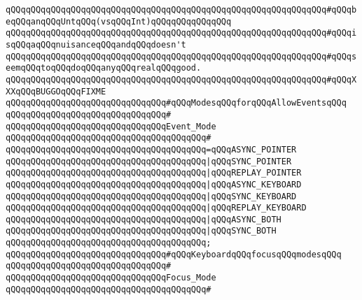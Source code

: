 \verb|qQQqqQQqqQQqqQQqqQQqqQQqqQQqqQQqqQQqqQQqqQQqqQQqqQQqqQQqqQQqqQQq#qQQqbeqQQqanqQQqUntqQQq(vsqQQqInt)qQQqqQQqqQQqqQQq|\newline
\verb|qQQqqQQqqQQqqQQqqQQqqQQqqQQqqQQqqQQqqQQqqQQqqQQqqQQqqQQqqQQqqQQq#qQQqisqQQqaqQQqnuisanceqQQqandqQQqdoesn't|\newline
\verb|qQQqqQQqqQQqqQQqqQQqqQQqqQQqqQQqqQQqqQQqqQQqqQQqqQQqqQQqqQQqqQQq#qQQqseemqQQqtoqQQqdoqQQqanyqQQqrealqQQqgood.|\newline
\verb|qQQqqQQqqQQqqQQqqQQqqQQqqQQqqQQqqQQqqQQqqQQqqQQqqQQqqQQqqQQqqQQq#qQQqXXXqQQqBUGGOqQQqFIXME|\newline
\newline
\verb|qQQqqQQqqQQqqQQqqQQqqQQqqQQqqQQq#qQQqModesqQQqforqQQqAllowEventsqQQq|\newline
\verb|qQQqqQQqqQQqqQQqqQQqqQQqqQQqqQQq#|\newline
\verb|qQQqqQQqqQQqqQQqqQQqqQQqqQQqqQQqEvent_Mode|\newline
\verb|qQQqqQQqqQQqqQQqqQQqqQQqqQQqqQQqqQQqqQQq#|\newline
\verb|qQQqqQQqqQQqqQQqqQQqqQQqqQQqqQQqqQQqqQQq=qQQqASYNC_POINTER|\newline
\verb|qQQqqQQqqQQqqQQqqQQqqQQqqQQqqQQqqQQqqQQq|\verb#|qQQqSYNC_POINTER#\newline
\verb|qQQqqQQqqQQqqQQqqQQqqQQqqQQqqQQqqQQqqQQq|\verb#|qQQqREPLAY_POINTER#\newline
\verb|qQQqqQQqqQQqqQQqqQQqqQQqqQQqqQQqqQQqqQQq|\verb#|qQQqASYNC_KEYBOARD#\newline
\verb|qQQqqQQqqQQqqQQqqQQqqQQqqQQqqQQqqQQqqQQq|\verb#|qQQqSYNC_KEYBOARD#\newline
\verb|qQQqqQQqqQQqqQQqqQQqqQQqqQQqqQQqqQQqqQQq|\verb#|qQQqREPLAY_KEYBOARD#\newline
\verb|qQQqqQQqqQQqqQQqqQQqqQQqqQQqqQQqqQQqqQQq|\verb#|qQQqASYNC_BOTH#\newline
\verb|qQQqqQQqqQQqqQQqqQQqqQQqqQQqqQQqqQQqqQQq|\verb#|qQQqSYNC_BOTH#\newline
\verb|qQQqqQQqqQQqqQQqqQQqqQQqqQQqqQQqqQQqqQQq;|\newline
\newline
\verb|qQQqqQQqqQQqqQQqqQQqqQQqqQQqqQQq#qQQqKeyboardqQQqfocusqQQqmodesqQQq|\newline
\verb|qQQqqQQqqQQqqQQqqQQqqQQqqQQqqQQq#|\newline
\verb|qQQqqQQqqQQqqQQqqQQqqQQqqQQqqQQqFocus_Mode|\newline
\verb|qQQqqQQqqQQqqQQqqQQqqQQqqQQqqQQqqQQqqQQq#|\newline
